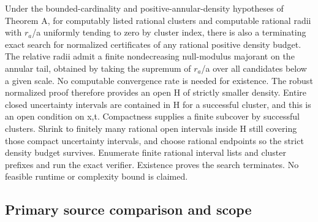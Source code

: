 \documentclass[
  11pt,
]{article}
\theoremstyle{remark}\newtheorem{remark}[theorem]{Remark}
\begin{document}
Under the bounded-cardinality and positive-annular-density hypotheses of
Theorem A, for computably listed rational clusters and computable
rational radii with \(r_a\)/a uniformly tending to zero by cluster
index, there is also a terminating exact search for normalized
certificates of any rational positive density budget. The relative radii
admit a finite nondecreasing null-modulus majorant on the annular tail,
obtained by taking the supremum of \(r_a\)/a over all candidates below a
given scale. No computable convergence rate is needed for existence. The
robust normalized proof therefore provides an open H of strictly smaller
density. Entire closed uncertainty intervals are contained in H for a
successful cluster, and this is an open condition on x,t. Compactness
supplies a finite subcover by successful clusters. Shrink to finitely
many rational open intervals inside H still covering those compact
uncertainty intervals, and choose rational endpoints so the strict
density budget survives. Enumerate finite rational interval lists and
cluster prefixes and run the exact verifier. Existence proves the search
terminates. No feasible runtime or complexity bound is claimed.

\subsection{Primary source comparison and
scope}\label{primary-source-comparison-and-scope}
\end{document}
